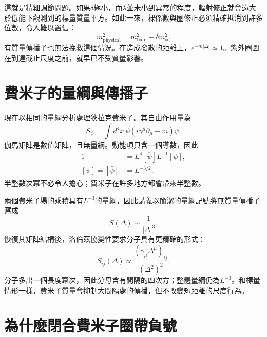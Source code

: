 這就是精細調節問題。如果\(\delta\)極小，而\(\lambda\)並未小到異常的程度，輻射修正就會遠大於低能下觀測到的標量質量平方。如此一來，裸係數與圈修正必須精確抵消到許多位數，令人難以置信：
\begin{equation}
m_{\mathrm{physical}}^2
=m_{\mathrm{bare}}^2+\delta m_\phi^2.
\end{equation}
有質量傳播子也無法挽救這個情況。在造成發散的距離上，\(e^{-m|\Delta|}\simeq1\)。紫外圈圖在到達截止尺度之前，就早已不受質量影響。

\section{費米子的量綱與傳播子}

現在以相同的量綱分析處理狄拉克費米子。其自由作用量為
\begin{equation}
S_\psi=\int d^4x\,
\bar\psi\left(i\gamma^\mu\partial_\mu-m\right)\psi.
\end{equation}
伽馬矩陣是數值矩陣，且無量綱。動能項只含一個導數，因此
\begin{align}
1
&=L^4[\bar\psi]L^{-1}[\psi],\\
[\psi]=[\bar\psi]&=L^{-3/2}.
\end{align}
半整數次冪不必令人擔心；費米子在許多地方都會帶來半整數。

\begin{classroomqa}
\end{classroomqa}

兩個費米子場的乘積具有\(L^{-3}\)的量綱，因此講義以簡潔的量綱記號將無質量傳播子寫成
\begin{equation}
S(\Delta)\sim\frac{1}{|\Delta|^3}.
\end{equation}
恢復其矩陣結構後，洛倫茲協變性要求分子具有更精確的形式：
\begin{equation}
S_{ij}(\Delta)
\propto
\frac{\left(\gamma_\mu\Delta^\mu\right)_{ij}}
{\left(\Delta^2\right)^2}.
\end{equation}
分子多出一個長度冪次，因此分母含有間隔的四次方；整體量綱仍為\(L^{-3}\)。和標量情形一樣，費米子質量會抑制大間隔處的傳播，但不改變短距離的尺度行為。

\section{為什麼閉合費米子圈帶負號}

